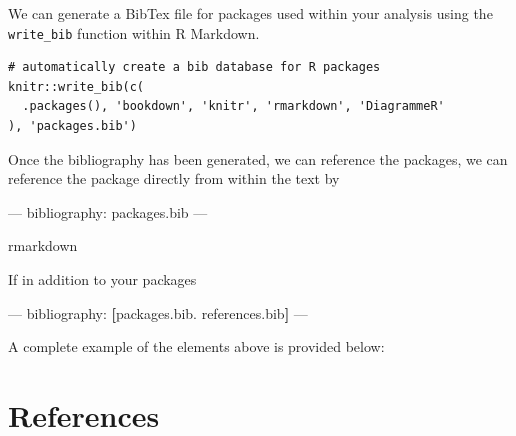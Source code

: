 \documentclass[]{book}
\newenvironment{Shaded}{\begin{snugshade}}{\end{snugshade}}
\newcommand{\AttributeTok}[1]{\textcolor[rgb]{0.77,0.63,0.00}{#1}}
\newcommand{\FunctionTok}[1]{\textcolor[rgb]{0.00,0.00,0.00}{#1}}
\newcommand{\KeywordTok}[1]{\textcolor[rgb]{0.13,0.29,0.53}{\textbf{#1}}}
\newcommand{\NormalTok}[1]{#1}
\newcommand{\OtherTok}[1]{\textcolor[rgb]{0.56,0.35,0.01}{#1}}
\theoremstyle{definition}
\theoremstyle{definition}
\theoremstyle{definition}
\theoremstyle{remark}
\begin{document}
We can generate a BibTex file for packages used within your analysis
using the \texttt{write\_bib} function within R Markdown.

\begin{verbatim}
# automatically create a bib database for R packages
knitr::write_bib(c(
  .packages(), 'bookdown', 'knitr', 'rmarkdown', 'DiagrammeR'
), 'packages.bib')
\end{verbatim}

Once the bibliography has been generated, we can reference the packages,
we can reference the package directly from within the text by

\begin{Shaded}
\begin{Highlighting}[]
\OtherTok{---}
\FunctionTok{bibliography:}\AttributeTok{ packages.bib}
\OtherTok{---}
\end{Highlighting}
\end{Shaded}

rmarkdown

If in addition to your packages

\begin{Shaded}
\begin{Highlighting}[]
\OtherTok{---}
\FunctionTok{bibliography:}\AttributeTok{ }\KeywordTok{[}\NormalTok{packages.bib. references.bib}\KeywordTok{]}
\OtherTok{---}
\end{Highlighting}
\end{Shaded}

A complete example of the elements above is provided below:

\hypertarget{references}{%
\chapter{References}\label{references}}


\end{document}
